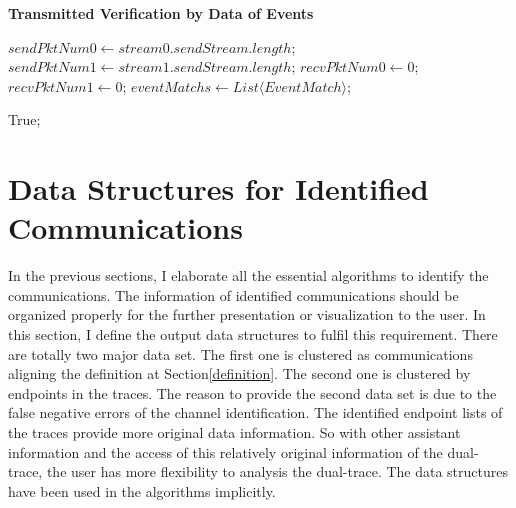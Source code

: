 \begin{algorithm}[H]
\DontPrintSemicolon
\caption{{\bf Transmitted Verification by Data of Events } \label{dataAlg2}}
\;
$sendPktNum0 \leftarrow stream0.sendStream.length$;\;
$sendPktNum1 \leftarrow stream1.sendStream.length$;\;
$recvPktNum0 \leftarrow 0$;\;
$recvPktNum1 \leftarrow 0$;\;
$eventMatchs \leftarrow List \langle EventMatch \rangle$;\;



 \KwRet True;\;
\end{algorithm}



\section{Data Structures for Identified Communications}
In the previous sections, I elaborate all the essential algorithms to identify the communications. The information of identified communications should be organized properly for the further presentation or visualization to the user. In this section, I define the output data structures to fulfil this requirement. There are totally two major data set. The first one is clustered as communications aligning the definition at Section\ref{definition}. The second one is clustered by endpoints in the traces. The reason to provide the second data set is due to the false negative errors of the channel identification. The identified endpoint lists of the traces provide more original data information. So with other assistant information and the access of this relatively original information of the dual-trace, the user has more flexibility to analysis the dual-trace. The data structures have been used in the algorithms implicitly.

